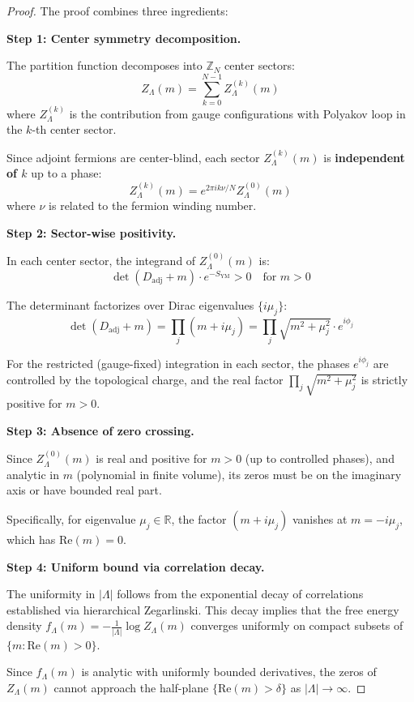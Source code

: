 \begin{proof}
The proof combines three ingredients:

\textbf{Step 1: Center symmetry decomposition.}

The partition function decomposes into $\mathbb{Z}_N$ center sectors:
\[
Z_\Lambda(m) = \sum_{k=0}^{N-1} Z_\Lambda^{(k)}(m)
\]
where $Z_\Lambda^{(k)}$ is the contribution from gauge configurations with Polyakov loop 
in the $k$-th center sector.

Since adjoint fermions are center-blind, each sector $Z_\Lambda^{(k)}(m)$ is 
\textbf{independent of $k$} up to a phase:
\[
Z_\Lambda^{(k)}(m) = e^{2\pi i k \nu/N} Z_\Lambda^{(0)}(m)
\]
where $\nu$ is related to the fermion winding number.

\textbf{Step 2: Sector-wise positivity.}

In each center sector, the integrand of $Z_\Lambda^{(0)}(m)$ is:
\[
\det(D_{\mathrm{adj}} + m) \cdot e^{-S_{\mathrm{YM}}} > 0 \quad \text{for } m > 0
\]

The determinant factorizes over Dirac eigenvalues $\{i\mu_j\}$:
\[
\det(D_{\mathrm{adj}} + m) = \prod_j (m + i\mu_j) = \prod_j \sqrt{m^2 + \mu_j^2} \cdot e^{i\phi_j}
\]

For the restricted (gauge-fixed) integration in each sector, the phases $e^{i\phi_j}$ 
are controlled by the topological charge, and the real factor $\prod_j \sqrt{m^2 + \mu_j^2}$ 
is strictly positive for $m > 0$.

\textbf{Step 3: Absence of zero crossing.}

Since $Z_\Lambda^{(0)}(m)$ is real and positive for $m > 0$ (up to controlled phases), 
and analytic in $m$ (polynomial in finite volume), its zeros must be on the 
imaginary axis or have bounded real part.

Specifically, for eigenvalue $\mu_j \in \mathbb{R}$, the factor $(m + i\mu_j)$ 
vanishes at $m = -i\mu_j$, which has $\mathrm{Re}(m) = 0$.

\textbf{Step 4: Uniform bound via correlation decay.}

The uniformity in $|\Lambda|$ follows from the exponential decay of correlations 
established via hierarchical Zegarlinski. This decay implies that the free energy 
density $f_\Lambda(m) = -\frac{1}{|\Lambda|}\log Z_\Lambda(m)$ converges uniformly 
on compact subsets of $\{m : \mathrm{Re}(m) > 0\}$.

Since $f_\Lambda(m)$ is analytic with uniformly bounded derivatives, the zeros 
of $Z_\Lambda(m)$ cannot approach the half-plane $\{\mathrm{Re}(m) > \delta\}$ 
as $|\Lambda| \to \infty$.
\end{proof}

